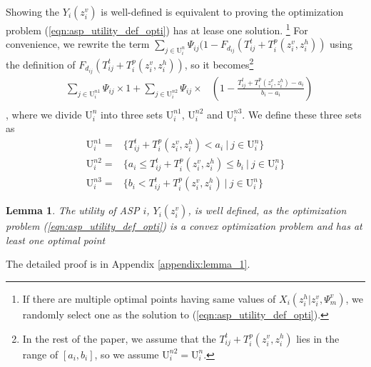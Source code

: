 \documentclass[10pt,journal, compsoc]{IEEEtran}
\newtheorem{lemma}{Lemma}
\begin{document}
Showing the $Y_i(z_i^v)$ is well-defined is equivalent to proving the optimization problem (\ref{eqn:asp_utility_def_opti}) has at lease one solution. \footnote{If there are multiple optimal points having same values of $X_i(z_i^h|z_i^v,\Psi_m^v)$, we randomly select one as the solution to (\ref{eqn:asp_utility_def_opti}).} For convenience, we rewrite the term $\sum_{j \in \mathrm{U}_i^n}\Psi_{ij}(1-F_{d_{ij}}(T_{ij}^t+T_i^p(z_i^v, z_i^h))$ using the definition of $F_{d_{ij}}(T_{ij}^t+T_i^p(z_i^v, z_i^h))$, so it becomes\footnote{In the rest of the paper, we assume that the $T_{ij}^t+T_i^p(z_i^v, z_i^h)$ lies in the range of $[a_i, b_i]$, so we assume $\mathrm{U}_i^{n2} = \mathrm{U}_i^{n}$.}
\begin{equation}
\begin{aligned}
&\sum_{j \in \mathrm{U}_i^{n1}}\Psi_{ij} \times 1 +\sum_{j \in \mathrm{U}_i^{n2}}\Psi_{ij} \times &(1-\frac{T_{ij}^t+T_i^p(z_i^v, z_i^h)-a_i}{b_i-a_i}) \\
\end{aligned}
\end{equation}
, where we divide $\mathrm{U}_i^{n}$ into three sets $\mathrm{U}_i^{n1}$, $\mathrm{U}_i^{n2}$ and $\mathrm{U}_i^{n3}$.
We define these three sets as 
\begin{subequations}\label{normal_set_user}
\begin{align}
\mathrm{U}_i^{n1} =& \{T_{ij}^t+T_i^p(z_i^v, z_i^h) < a_i\ |\ j \in \mathrm{U}_i^{n}\}\label{normal_set_user_1} \\
\mathrm{U}_i^{n2} =& \{a_i \leq T_{ij}^t+T_i^p(z_i^v, z_i^h) \leq b_i\ |\ j \in \mathrm{U}_i^{n}\}\label{normal_set_user_2} \\
\mathrm{U}_i^{n3} =& \{ b_i < T_{ij}^t+T_i^p(z_i^v, z_i^h) \ |\ j \in \mathrm{U}_i^{n}\}\label{normal_set_user_3}
\end{align}
\end{subequations}
\begin{lemma}
The utility of ASP $i$, $Y_i(z_i^v)$, is well defined, as the optimization problem (\ref{eqn:asp_utility_def_opti}) is a convex optimization problem and has at least one optimal point 
\end{lemma}
The detailed proof is in Appendix \ref{appendix:lemma_1}.
\end{document}
